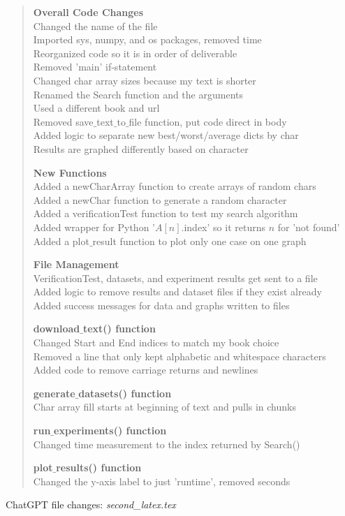 \documentclass{article}
\begin{document}
\begin{quote}
\textbf{Overall Code Changes} \\
Changed the name of the file\\
Imported sys, numpy, and os packages, removed time \\
Reorganized code so it is in order of deliverable \\
Removed 'main' if-statement \\
Changed char array sizes because my text is shorter \\
Renamed the Search function and the arguments \\
Used a different book and url \\
Removed save$\_$text$\_$to$\_$file function, put code direct in body \\
Added logic to separate new best/worst/average dicts by char \\
Results are graphed differently based on character

\textbf{New Functions} \\
Added a newCharArray function to create arrays of random chars \\
Added a newChar function to generate a random character \\
Added a verificationTest function to test my search algorithm\\
Added wrapper for Python '$A[n]$.index' so it returns $n$ for 'not found' \\
Added a plot$\_$result function to plot only one case on one graph

\textbf{File Management} \\
VerificationTest, datasets, and experiment results get sent to a file \\
Added logic to remove results and dataset files if they exist already \\
Added success messages for data and graphs written to files

\textbf{download$\_$text() function} \\
Changed Start and End indices to match my book choice \\
Removed a line that only kept alphabetic and whitespace characters \\
Added code to remove carriage returns and newlines

\textbf{generate$\_$datasets() function} \\
Char array fill starts at beginning of text and pulls in chunks

\textbf{run$\_$experiments() function} \\
Changed time measurement to the index returned by Search()

\textbf{plot$\_$results() function} \\
Changed the y-axis label to just 'runtime', removed seconds

\end{quote}
ChatGPT file changes: \textit{second\_latex.tex}
\end{document}
